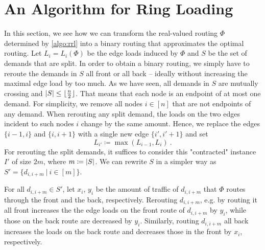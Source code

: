 \section{An Algorithm for Ring Loading}
\label{sec:ring-loading}

In this section, we see how we can transform the real-valued routing $\Phi$ determined by \cref{algo:rrl} into a binary routing that approximates the optimal routing.
Let $L_i = L_i(\Phi)$ be the edge loads induced by $\Phi$ and $S$ be the set of demands that are split.
In order to obtain a binary routing, we simply have to reroute the demands in $S$ all front or all back -- ideally without increasing the maximal edge load by too much. 
As we have seen, all demands in $S$ are mutually crossing and $\abs{S} \leq \lfloor \frac{n}{2} \rfloor$.
That means that each node is an endpoint of at most one demand.
For simplicity, we remove all nodes $i \in [n]$ that are not endpoints of any demand.
When rerouting any split demand, the loads on the two edges incident to such nodes $i$ change by the same amount.
Hence, we replace the edges $\{i-1, i\}$ and $\{i, i+1\}$ with a single new edge $\{i', i'+1\}$ and set 
\begin{equation}
	L_{i'} \coloneqq \max(L_{i-1}, L_i) \ .
\end{equation}
For rerouting the split demands, it suffices to consider this "contracted" instance $I'$ of size $2m$, where $m \coloneqq \abs{S}$.
We can rewrite $S$ in a simpler way as $S' = \{d_{i, i+m}\ |\ i \in [m]\}$.

For all $d_{i, i+m} \in S'$, let $x_i$, $y_i$ be the amount of traffic of $d_{i, i+m}$ that $\Phi$ routes through the front and the back, respectively.
Rerouting $d_{i, i+m}$, e.g. by routing it all front increases the the edge loads on the front route of $d_{i, i+m}$ by $y_i$, while those on the back route are decreased by $y_i$.
Similarly, routing $d_{i, i+m}$ all back increases the loads on the back route and decreases those in the front by $x_i$, respectively.

